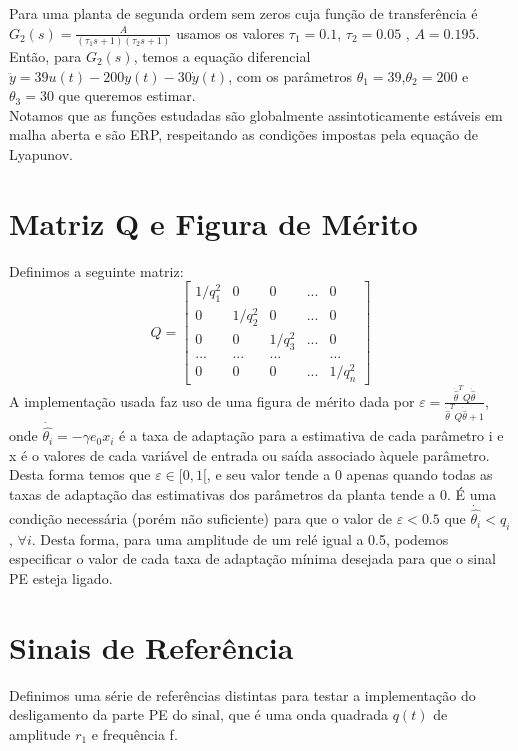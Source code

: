 \documentclass[
	12pt,				%
	openright,			%
	twoside,			%
	a4paper,			%
	english,			%
	french,				%
	spanish,			%
	brazil				%
	]{abntex2}
\begin{document}
 Para uma planta de segunda ordem sem zeros cuja função de transferência é $G_2(s) = \frac{A}{(\tau_1 s + 1)(\tau_2 s + 1)}$ usamos os valores $\tau_1=0.1$, $\tau_2=0.05$ , $A=0.195$.\\
 
 Então, para $G_2(s)$, temos a equação diferencial $\ddot{y}= 39u(t) - 200y(t) - 30\dot{y}(t)$, com os parâmetros $\theta_1=39$,$\theta_2=200$ e $\theta_3=30$ que queremos estimar.\\

Notamos que as funções estudadas são globalmente assintoticamente estáveis em malha aberta e são ERP, respeitando as condições impostas pela equação de Lyapunov. 

\section{Matriz Q e Figura de Mérito}

 Definimos a seguinte matriz: \[
Q=
  \begin{bmatrix}
    1/q_1^2 & 0       &  0       &  ... &  0      \\
    0       & 1/q_2^2 &  0       &  ... &  0      \\
    0       & 0       &  1/q_3^2 &  ... &  0      \\
    ...     & ...     &  ...     &      &  ...    \\
    0       & 0       &  0       &  ... & 1/q_n^2
  \end{bmatrix}
\]
A implementação usada faz uso de uma figura de mérito dada por $\varepsilon = \frac{\dot{\hat{\theta}}^TQ\dot{\hat{\theta}}}{\dot{\hat{\theta}}^TQ\dot{\hat{\theta}}+1}$, onde $\dot{\hat{\theta_i}} = -\gamma e_0 x_i$ é a taxa de adaptação para a estimativa de cada parâmetro i e x é o valores de cada variável de entrada ou saída associado àquele parâmetro. Desta forma temos que $\varepsilon \in [0,1[$, e seu valor tende a 0 apenas quando todas as taxas de adaptação das estimativas dos parâmetros da planta tende a 0. É uma condição necessária (porém não suficiente) para que o valor de $\varepsilon<0.5$ que $\dot{\hat{\theta_i}}<q_i$, $ \forall i$. Desta forma, para uma amplitude de um relé igual a 0.5, podemos especificar o valor de cada taxa de adaptação mínima desejada para que o sinal PE esteja ligado.\\

\section{Sinais de Referência}
 Definimos uma série de referências distintas para testar a implementação do desligamento da parte PE do sinal, que é uma onda quadrada $q(t)$ de amplitude $r_1$ e frequência f.\\
\end{document}
